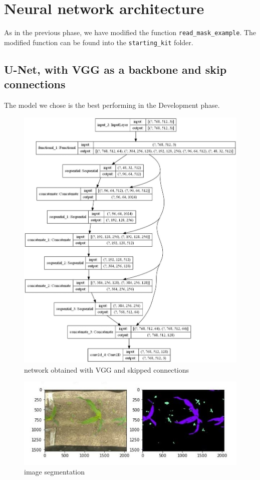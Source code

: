 \documentclass[12pt,a4paper]{report}
\begin{document}

	\chapter{Neural network architecture}		
As in the previous phase, we have modified the function \texttt{read\_mask\_example}. The modified function can be found into the \texttt{starting\_kit} folder.
		
		\section{U-Net, with VGG as a backbone and skip connections}
The model we chose is the best performing in the Development phase.
\begin{figure}[H]
	\includegraphics[scale = .45, center]{vgg_model}
	\caption{network obtained with VGG and skipped connections}
\end{figure}
\begin{figure}[H]
	\includegraphics[scale = .75, center]{vgg_upsampling_with}
	\caption{image segmentation}
\end{figure}
		
\end{document}
